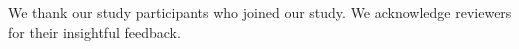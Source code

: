 We thank our study participants who joined our study. We acknowledge reviewers for their insightful feedback. 